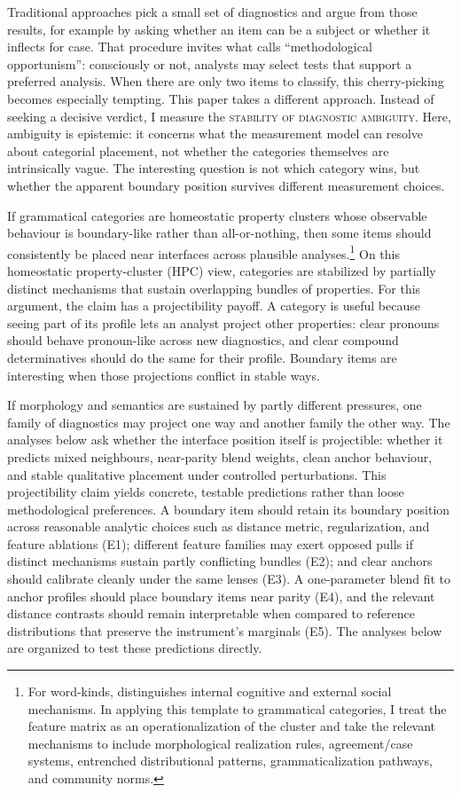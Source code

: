 \documentclass[12pt]{article}
\providecommand{\term}[1]{\textsc{#1}}
\providecommand{\abbr}[1]{\textsc{#1}}
\begin{document}
Traditional approaches pick a small set of diagnostics and argue from those results, for example by asking whether an item can be a subject or whether it inflects for case. That procedure invites what \textcite{croft2001radical} calls \enquote{methodological opportunism}: consciously or not, analysts may select tests that support a preferred analysis. When there are only two items to classify, this cherry-picking becomes especially tempting. This paper takes a different approach. Instead of seeking a decisive verdict, I measure the \term{stability of diagnostic ambiguity}. Here, ambiguity is epistemic: it concerns what the measurement model can resolve about categorial placement, not whether the categories themselves are intrinsically vague. The interesting question is not which category wins, but whether the apparent boundary position survives different measurement choices.

If grammatical categories are homeostatic property clusters \parencite{miller2021} whose observable behaviour is boundary-like rather than all-or-nothing, then some items should consistently be placed near interfaces across plausible analyses.\footnote{For word-kinds, \textcite{miller2021} distinguishes internal cognitive and external social mechanisms. In applying this template to grammatical categories, I treat the feature matrix as an operationalization of the cluster and take the relevant mechanisms to include morphological realization rules, agreement/case systems, entrenched distributional patterns, grammaticalization pathways, and community norms.} On this homeostatic property-cluster (\abbr{HPC}) view, categories are stabilized by partially distinct mechanisms that sustain overlapping bundles of properties. For this argument, the claim has a projectibility payoff. A category is useful because seeing part of its profile lets an analyst project other properties: clear pronouns should behave pronoun-like across new diagnostics, and clear compound determinatives should do the same for their profile. Boundary items are interesting when those projections conflict in stable ways.

If morphology and semantics are sustained by partly different pressures, one family of diagnostics may project one way and another family the other way. The analyses below ask whether the interface position itself is projectible: whether it predicts mixed neighbours, near-parity blend weights, clean anchor behaviour, and stable qualitative placement under controlled perturbations. This projectibility claim yields concrete, testable predictions rather than loose methodological preferences. A boundary item should retain its boundary position across reasonable analytic choices such as distance metric, regularization, and feature ablations (E1); different feature families may exert opposed pulls if distinct mechanisms sustain partly conflicting bundles (E2); and clear anchors should calibrate cleanly under the same lenses (E3). A one-parameter blend fit to anchor profiles should place boundary items near parity (E4), and the relevant distance contrasts should remain interpretable when compared to reference distributions that preserve the instrument's marginals (E5). The analyses below are organized to test these predictions directly.
\end{document}
